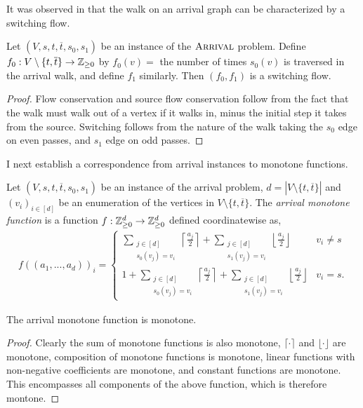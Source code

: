   It was observed in \citep{arrivalBasic} that the walk on an arrival graph can be characterized
  by a switching flow.
  \begin{lemma}\label{walkSwitching}
    Let $(V, s, t, \overline{t}, s_0, s_1)$ be an instance of the $\textsc{Arrival}$ problem. Define
    $f_0 : V \setminus \{t, \overline{t}\} \to \mathbb{Z}_{\geq 0}$ by $f_0(v) =$ the number of times $s_0(v)$
    is traversed in the arrival walk, and define $f_1$ similarly. Then $(f_0, f_1)$ is a switching
    flow.
  \end{lemma}
  \begin{proof}
    Flow conservation and source flow conservation follow from the fact that the walk must walk
    out of a vertex if it walks in, minus the initial step it takes from the source. Switching
    follows from the nature of the walk taking the $s_0$ edge on even passes, and $s_1$ edge on odd
    passes.
  \end{proof}
  I next establish a correspondence from arrival instances to monotone functions.
  \begin{definition}
    Let $(V, s, t, \overline{t}, s_0, s_1)$ be an instance of the arrival problem,
    $d = |V \setminus \{t, \overline{t}\}|$ and
    $(v_i)_{i \in [d]}$ be an enumeration of the vertices in 
    $V \setminus \{t, \overline{t}\}$. The \emph{arrival monotone function} is a function
    $f : \mathbb{Z}_{\geq 0}^d \to \mathbb{Z}_{\geq 0}^d$ defined coordinatewise as,
  \begin{align*}
    f((a_1, ..., a_d))_i = \begin{cases}
    \sum_{\substack{j \in [d] \\ s_0(v_j) = v_i}} \left\lceil \frac{a_j}{2} \right\rceil
      + \sum_{\substack{j \in [d] \\ s_1(v_j) = v_i}} \left\lfloor \frac{a_j}{2} \right\rfloor
      & v_i \neq s \\
    1 + \sum_{\substack{j \in [d] \\ s_0(v_j) = v_i}} \left\lceil \frac{a_j}{2} \right\rceil
      + \sum_{\substack{j \in [d] \\ s_1(v_j) = v_i}} \left\lfloor \frac{a_j}{2} \right\rfloor
      & v_i = s.
    \end{cases}
  \end{align*}
  \end{definition}
  \begin{lemma}\label{arrMonotoneIsMonotone}
    The arrival monotone function is monotone.
  \end{lemma}
  \begin{proof}
    Clearly the sum of monotone functions is also monotone, $\lceil \cdot \rceil$ and $\lfloor \cdot \rfloor$
    are monotone, composition of monotone functions is monotone, linear functions with non-negative coefficients
    are monotone, and constant functions are monotone. This encompasses all components of the above function,
    which is therefore montone.
  \end{proof}
